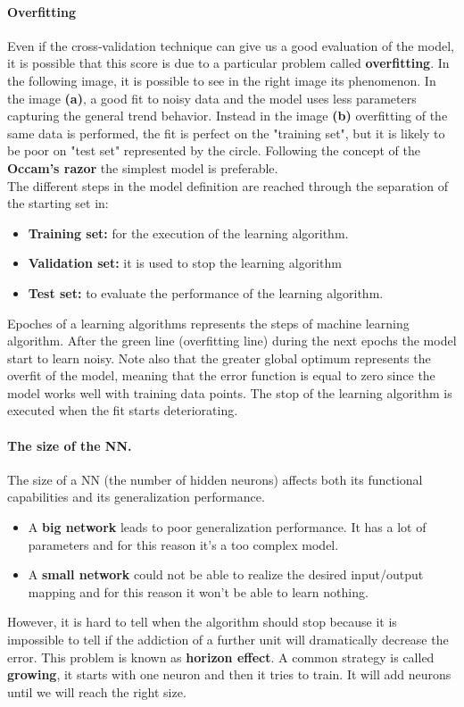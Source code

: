 \paragraph{Overfitting}
Even if the cross-validation technique can give us a good evaluation of the model, it is possible that this score is due to a particular problem called \textbf{overfitting}. In the following image, it is possible to see in the right image its phenomenon.
In the image \textbf{(a)}, a good fit to noisy data and the model uses less parameters capturing the general trend behavior. Instead in the image \textbf{(b)} overfitting of the same data is performed, the fit is perfect on the "training set", but it is likely to be poor on "test set" represented by the circle. Following the concept of the \textbf{Occam's razor} the simplest model is preferable.\\
The different steps in the model definition are reached through the separation of the starting set in:
\begin{itemize}
	\item \textbf{Training set:} for the execution of the learning algorithm.
	\item \textbf{Validation set:} it is used to stop the learning algorithm
	\item \textbf{Test set:} to evaluate the performance of the learning algorithm.
\end{itemize}
Epoches of a learning algorithms represents the steps of machine learning algorithm. After the green line (overfitting line) during the next epochs the model start to learn noisy. Note also that the greater global optimum represents the overfit of the model, meaning that the error function is equal to zero since the model works well with training data points.
The stop of the learning algorithm is executed when the fit starts deteriorating.

\paragraph*{The size of the NN.} The size of a NN (the number of hidden neurons) affects both its functional capabilities and its generalization performance.
\begin{itemize}
	\item A \textbf{big network} leads to poor generalization performance. It has a lot of parameters and for this reason it's a too complex model.
	\item A \textbf{small network} could not be able to realize the desired input/output mapping and for this reason it won't be able to learn nothing.
\end{itemize}
However, it is hard to tell when the algorithm should stop because it is impossible to tell if the addiction of a further unit will dramatically decrease the error. This problem is known as \textbf{horizon effect}. A common strategy is called \textbf{growing}, it starts with one neuron and then it tries to train. It will add neurons until we will reach the right size.

